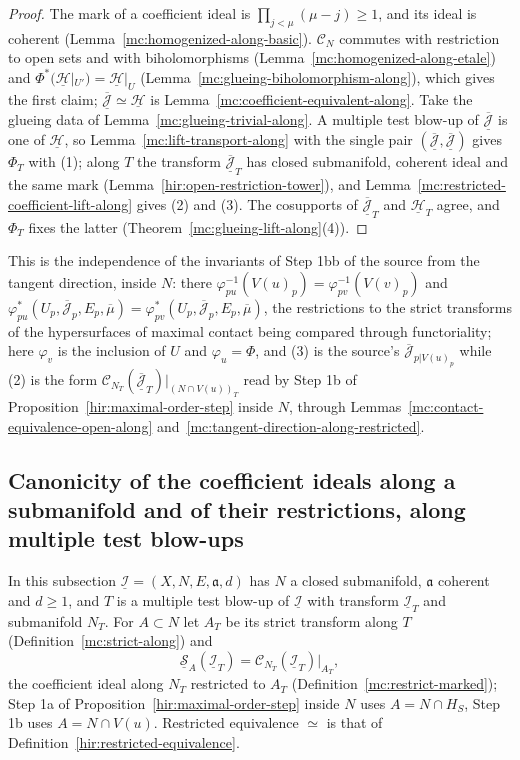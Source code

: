 \begin{proof}
\leanok
The mark of a coefficient ideal is \(\prod_{j<\mu}(\mu-j)\ge1\), and its ideal is coherent (Lemma~\ref{mc:homogenized-along-basic}). \(\mathcal C_N\) commutes with restriction to
open sets and with biholomorphisms (Lemma~\ref{mc:homogenized-along-etale}) and \(\Phi^*(\underline{\mathcal H}|_{U'})=\underline{\mathcal H}|_U\)
(Lemma~\ref{mc:glueing-biholomorphism-along}), which gives the first claim; \(\overline{\underline{\mathcal J}}\simeq\underline{\mathcal H}\) is
Lemma~\ref{mc:coefficient-equivalent-along}. Take the glueing data of Lemma~\ref{mc:glueing-trivial-along}. A multiple test blow-up of \(\overline{\underline{\mathcal J}}\) is one of
\(\underline{\mathcal H}\), so Lemma~\ref{mc:lift-transport-along} with the single pair \((\overline{\underline{\mathcal J}},\overline{\underline{\mathcal J}})\) gives \(\Phi_T\) with (1); along
\(T\) the transform \(\overline{\underline{\mathcal J}}_T\) has closed submanifold, coherent ideal and the same mark (Lemma~\ref{hir:open-restriction-tower}), and
Lemma~\ref{mc:restricted-coefficient-lift-along} gives (2) and (3). The cosupports of \(\overline{\underline{\mathcal J}}_T\) and \(\underline{\mathcal H}_T\) agree, and \(\Phi_T\) fixes the
latter (Theorem~\ref{mc:glueing-lift-along}(4)).
\end{proof}
This is the independence of the invariants of Step 1bb of the source from the tangent direction, inside \(N\): there \(\varphi_{pu}^{-1}(V(u)_p)=\varphi_{pv}^{-1}(V(v)_p)\) and
\(\varphi_{pu}^*(U_p,\overline{\mathcal J}_p,E_p,\overline\mu)=\varphi_{pv}^*(U_p,\overline{\mathcal J}_p,E_p,\overline\mu)\), the restrictions to the strict transforms of the
hypersurfaces of maximal contact being compared through functoriality; here \(\varphi_v\) is the inclusion of \(U\) and \(\varphi_u=\Phi\), and (3) is the source's
\(\overline{\mathcal J}_{p|V(u)_p}\) while (2) is the form \(\mathcal C_{N_T}(\overline{\underline{\mathcal J}}_T)|_{(N\cap V(u))_T}\) read by Step 1b of
Proposition~\ref{hir:maximal-order-step} inside \(N\), through Lemmas~\ref{mc:contact-equivalence-open-along} and~\ref{mc:tangent-direction-along-restricted}.

\subsection{Canonicity of the coefficient ideals along a submanifold and of their restrictions, along multiple test blow-ups}

In this subsection \(\underline{\mathcal I}=(X,N,E,\mathfrak a,d)\) has \(N\) a closed submanifold, \(\mathfrak a\) coherent and \(d\ge1\), and \(T\) is a multiple test blow-up
of \(\underline{\mathcal I}\) with transform \(\underline{\mathcal I}_T\) and submanifold \(N_T\). For \(A\subset N\) let \(A_T\) be its strict transform along \(T\)
(Definition~\ref{mc:strict-along}) and
\[\underline{\mathcal S}_A(\underline{\mathcal I}_T)=\mathcal C_{N_T}(\underline{\mathcal I}_T)|_{A_T},\]
the coefficient ideal along \(N_T\) restricted to \(A_T\) (Definition~\ref{mc:restrict-marked}); Step 1a of Proposition~\ref{hir:maximal-order-step} inside \(N\) uses
\(A=N\cap H_S\), Step 1b uses \(A=N\cap V(u)\). Restricted equivalence \(\simeq\) is that of Definition~\ref{hir:restricted-equivalence}.

